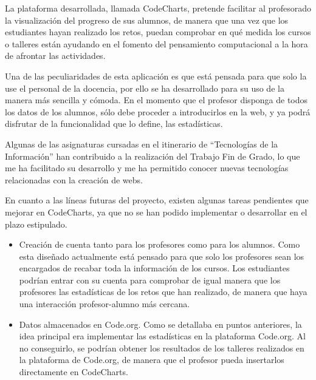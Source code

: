 

La plataforma desarrollada, llamada CodeCharts, pretende facilitar al profesorado la visualización del progreso de sus alumnos, de manera que una vez que los estudiantes hayan realizado los retos, puedan comprobar en qué medida los cursos
o talleres están ayudando en el fomento del pensamiento computacional a la hora de afrontar las actividades.

Una de las peculiaridades de esta aplicación es que está pensada para que solo la use el personal de la docencia, por ello se ha desarrollado para su uso de la manera más sencilla y cómoda. En el momento que el profesor disponga de todos los datos de los alumnos,
sólo debe proceder a introducirlos en la web, y ya podrá disfrutar de la funcionalidad que lo define, las estadísticas.

Algunas de las asignaturas cursadas en el itinerario de ``Tecnologías de la Información'' han contribuido a la realización del Trabajo Fin de Grado, lo que me ha facilitado su desarrollo y me ha permitido conocer nuevas tecnologías relacionadas con la creación de webs.

En cuanto a las líneas futuras del proyecto, existen algunas tareas pendientes que mejorar en CodeCharts, ya que no se han podido implementar o desarrollar en el plazo estipulado.

\begin{itemize}
    \item Creación de cuenta tanto para los profesores como para los alumnos. Como esta diseñado actualmente está pensado para que solo los profesores sean los encargados de recabar toda la información de los cursos. Los estudiantes podrían entrar
    con su cuenta para comprobar de igual manera que los profesores las estadísticas de los retos que han realizado, de manera que haya una interacción profesor-alumno más cercana.
    \item Datos almacenados en Code.org. Como se detallaba en puntos anteriores, la idea principal era implementar las estadísticas en la plataforma Code.org. Al no conseguirlo, se podrían obtener los resultados de los talleres realizados en la plataforma de Code.org, 
    de manera que el profesor pueda insertarlos directamente en CodeCharts.
\end{itemize}




